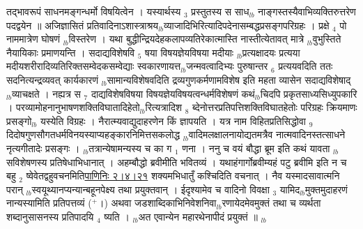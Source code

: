 \documentclass[article,12pt,a4paper]{memoir}%
\newcommand{\add}[1]{($^{+}$#1)}
\begin{document}
	  
	  \pstart \leavevmode%
	तद्भावरूपं साधनमङ्गन्धर्मो विषयित्वेन । यस्यार्थस्य {\tiny $_{3}$} प्रस्तुतस्य स साध{\tiny $_{lb}$} \leavevmode{} नाङ्गस्तस्यैवाभिव्यक्तिरुत्तरेण पदद्वयेन ॥ अजिज्ञासितं प्रतिवादिनाऽशास्त्राश्रय{\tiny $_{lb}$}व्याजादिभिरित्यादिपदेनासम्बद्धप्रसङ्गपरिग्रहः । प्रक्षे {\tiny $_{4}$} पो नाममात्रेण घोषणं {\tiny $_{lb}$}विस्तरेण । यथा बुद्धीन्द्रियदेहकलापव्यतिरेकात्मास्ति नास्तीत्येतावत् मात्रे {\tiny $_{lb}$}वुभुस्तिते नैयायिकाः प्रमाणयन्ति । सदाद्यविशेषवि {\tiny $_{5}$} षया विषयज्ञेयविषया मदीयाः {\tiny $_{lb}$}प्रत्यक्षादयः प्रत्यया मदीयशरीरादिव्यतिरिक्तसम्वेदकसम्वेद्याः स्वकारणायत्त{\tiny $_{lb}$}जन्मवत्वादिभ्यः पुरुषान्तर {\tiny $_{6}$} प्रत्ययवदिति ततः सदनित्यन्द्रव्यवत् कार्यकारणं {\tiny $_{lb}$}सामान्यविशेषवदिति द्रव्यगुणकर्मणामविशेष इति महता व्यासेन सदाद्यविशेषाद् {\tiny $_{lb}$}व्याचक्षते । नह्यत्र स {\tiny $_{7}$} दाद्यविशेषविषया विषयज्ञेयविषयत्वन्धर्मविशेषणं कथं{\tiny $_{lb}$}चिदपि प्रकृतसाध्यसिध्युपकारि । परव्यामोहनानुभाषणशक्तिविघातादिहेतो{\tiny $_{lb}$}रित्यत्रादिश {\tiny $_{8}$} ब्देनोत्तरप्रतिपत्तिशक्तिविघातहेतोः परिग्रहः क्रियमाणः प्रसङ्गो{\tiny $_{lb}$} \leavevmode{} यस्येति विग्रहः । नैरात्म्यवाद्युदाहरणेन किं ज्ञापयति । {\color{DodgerBlue3}यत्र नाम} विहितप्रतिसिद्धोवा {\tiny $_{9}$} \leavevmode{} दिदोषगुणसौगतधर्मविनयस्याप्यहङ्कारनिमित्तसकलोद्ध {\tiny $_{lb}$}वादिमलक्षालनायोद्यतमत्रैव नात्मवादिनस्तत्साधने नृत्यगीतादेः प्रसङ्गः । {\tiny $_{lb}$}तत्रान्येषामन्यस्य च का ग {\tiny $_{1}$} णना । ननु च वयं {\color{DodgerBlue3}बौद्धा} ब्रूम इति कथं यावता {\tiny $_{lb}$}सविशेषणस्य प्रतिषेधाभिधानात् । अहम्बौद्धो ब्रवीमीति भवितव्यं । यथाहंगार्गोब्रवीम्यहं पटु ब्रवीमि इति न च बहु {\tiny $_{2}$} ष्वेवेतद्वहुवचनमिति\href{http://sarit.indology.info/?cref=P\%C4\%81.2.4.21}{पाणिनिः  २।४।२१} शक्यमभिधातुँ कश्चिदिति वचनात् । नैव यस्मादसावात्मनि परान् {\tiny $_{lb}$}स्वयूथ्यानप्यन्यान्बहूनपेक्ष्य तथा प्रयुक्तवान् । ईदृश्यामेव च वादिनो विवक्षा {\tiny $_{3}$} यामिद{\tiny $_{lb}$}मुक्तमुदाहरणं नान्यस्यामिति प्रतिपत्तव्यं \add{।} अथवा जडशाब्दिकाभिनिवेशनिवा{\tiny $_{lb}$}रणायेदमेवमुक्तं तथा च व्यर्थता शब्दानुसासनस्य प्रतिपादयि {\tiny $_{4}$} ष्यति । {\tiny $_{lb}$}अत एवान्येन महारथेनापीदं प्रयुक्तं ॥ {\tiny $_{lb}$} 
	    \pend%
	  
\end{document}

